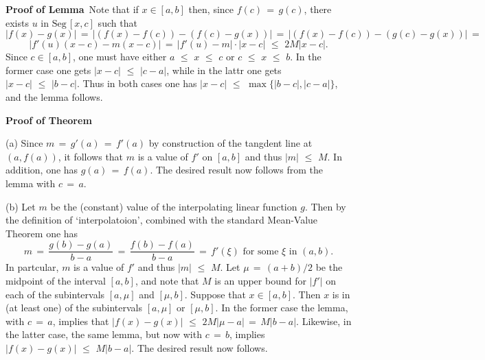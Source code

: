         {\bf Proof of Lemma}\, Note that if $x{\in}[a,b]$ then, since $f(c) \,=\, g(c)$, there exists $u$ in $\mbox{Seg}\,[x,c]$ such that
        \begin{displaymath}
        |f(x)-g(x)| \,=\, |(f(x)-f(c)) - (f(c) - g(x))| \,=\, |(f(x)-f(c)) - (g(c) - g(x))| \,=\, 
        \end{displaymath}
        \begin{displaymath}
        |f'(u)(x-c) - m(x-c)| \,=\, |f'(u)-m|{\cdot}|x-c|\,\,{\leq}\,\,2M|x-c|.
        \end{displaymath}
    Since $c{\in}[a,b]$, one must have either $a\,\,{\leq}\,\,x\,\,{\leq}\,\,c$ or $c\,\,{\leq}\,\,x\,\,{\leq}\,\,b$.
    In the former case one gets $|x-c|\,\,{\leq}\,\,|c-a|$, while in the lattr one gets $|x-c|\,\,{\leq}\,\,|b-c|$.
    Thus in both cases one has $|x-c|\,\,{\leq}\,\,\max\{|b-c|, |c-a|\}$, and the lemma follows.


\V

        {\bf Proof of Theorem}

        (a) Since $m \,=\, g'(a) \,=\, f'(a)$ by construction of the tangdent line at $(a,f(a))$, it follows that $m$ is a value of $f'$ on $[a,b]$ and thus $|m|\,\,{\leq}\,\,M$.
    In addition, one has $g(a) \,=\, f(a)$.
    The desired result now follows from the lemma with $c \,=\, a$.

\V

        (b) Let $m$ be the (constant) value of the interpolating linear function $g$. Then by the definition of `interpolatoion', combined with the standard Mean-Value Theorem one has
        \begin{displaymath}
        m \,=\, \frac{g(b)-g(a)}{b-a} \,=\, \frac{f(b)-f(a)}{b-a} \,=\, f'({\xi}) \mbox{ for some ${\xi}$ in $(a,b)$}.
        \end{displaymath}
    In partcular, $m$ is a value of $f'$ and thus $|m|\,\,{\leq}\,\,M$. Let ${\mu} \,=\, (a+b)/2$ be the midpoint of the interval $[a,b]$,
    and note that $M$ is an upper bound for $|f'|$ on each of the subintervals $[a,{\mu}]$ and $[{\mu},b]$.
    Suppose that $x{\in}[a,b]$. Then $x$ is in (at least one) of the subintervals $[a,{\mu}]$ or $[{\mu},b]$.
    In the former case the lemma, with $c \,=\, a$, implies that $|f(x)-g(x)|\,\,{\leq}\,\,2M|{\mu}-a| \,=\, M|b-a|$.
    Likewise, in the latter case, the same lemma, but now with $c \,=\, b$, implies $|f(x)-g(x)|\,\,{\leq}\,\,M|b-a|$.
    The desired result now follows. \Q

\V


